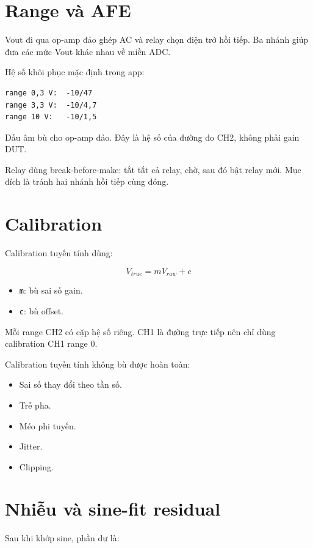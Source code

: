\documentclass[12pt,a4paper,oneside]{article}
\newcommand{\inlinecode}[1]{\texttt{#1}}
\begin{document}
\section{Range và AFE}

Vout đi qua op-amp đảo ghép AC và relay chọn điện trở hồi tiếp. Ba nhánh giúp đưa các mức Vout khác nhau về miền ADC.

Hệ số khôi phục mặc định trong app:

\begin{Verbatim}[breaklines=true,breakanywhere=true,fontsize=\small]
range 0,3 V:  -10/47
range 3,3 V:  -10/4,7
range 10 V:   -10/1,5
\end{Verbatim}

Dấu âm bù cho op-amp đảo. Đây là hệ số của đường đo CH2, không phải gain DUT.

Relay dùng break-before-make: tắt tất cả relay, chờ, sau đó bật relay mới. Mục đích là tránh hai nhánh hồi tiếp cùng đóng.

\section{Calibration}

Calibration tuyến tính dùng:

\[
V_{true}=mV_{raw}+c
\]

\begin{itemize}
\item \inlinecode{m}: bù sai số gain.
\item \inlinecode{c}: bù offset.
\end{itemize}

Mỗi range CH2 có cặp hệ số riêng. CH1 là đường trực tiếp nên chỉ dùng calibration CH1 range 0.

Calibration tuyến tính không bù được hoàn toàn:

\begin{itemize}
\item Sai số thay đổi theo tần số.
\item Trễ pha.
\item Méo phi tuyến.
\item Jitter.
\item Clipping.
\end{itemize}

\section{Nhiễu và sine-fit residual}

Sau khi khớp sine, phần dư là:
\end{document}
